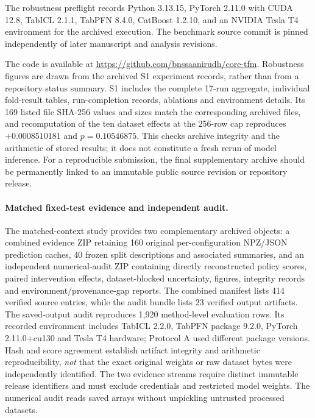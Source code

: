 \documentclass[a4paper,fleqn]{cas-sc}
\begin{document}
The robustness preflight records Python 3.13.15, PyTorch 2.11.0 with CUDA 12.8, TabICL 2.1.1, TabPFN 8.4.0, CatBoost 1.2.10, and an NVIDIA Tesla T4 environment for the archived execution. The benchmark source commit is pinned independently of later manuscript and analysis revisions.

The code is available at \url{https://github.com/bnssaanirudh/core-tfm}. Robustness figures are drawn from the archived S1 experiment records, rather than from a repository status summary. S1 includes the complete 17-run aggregate, individual fold-result tables, run-completion records, ablations and environment details. Its 169 listed file SHA-256 values and sizes match the corresponding archived files, and recomputation of the ten dataset effects at the 256-row cap reproduces $+0.0008510181$ and $p=0.10546875$. This checks archive integrity and the arithmetic of stored results; it does not constitute a fresh rerun of model inference. For a reproducible submission, the final supplementary archive should be permanently linked to an immutable public source revision or repository release.


\paragraph{Matched fixed-test evidence and independent audit.}
The matched-context study provides two complementary archived objects: a combined evidence ZIP retaining 160 original per-configuration NPZ/JSON prediction caches, 40 frozen split descriptions and associated summaries, and an independent numerical-audit ZIP containing directly reconstructed policy scores, paired intervention effects, dataset-blocked uncertainty, figures, integrity records and environment/provenance-gap reports. The combined manifest lists 414 verified source entries, while the audit bundle lists 23 verified output artifacts. The saved-output audit reproduces 1,920 method-level evaluation rows. Its recorded environment includes TabICL 2.2.0, TabPFN package 9.2.0, PyTorch 2.11.0+cu130 and Tesla T4 hardware; Protocol A used different package versions. Hash and score agreement establish artifact integrity and arithmetic reproducibility, \emph{not} that the exact original weights or raw dataset bytes were independently identified. The two evidence streams require distinct immutable release identifiers and must exclude credentials and restricted model weights. The numerical audit reads saved arrays without unpickling untrusted processed datasets.
\end{document}
